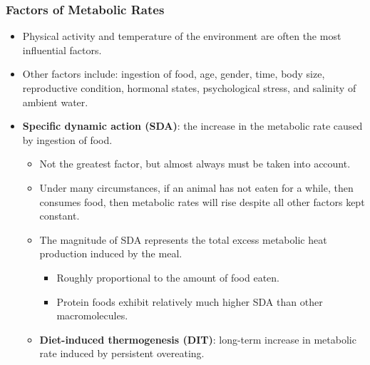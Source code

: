 \documentclass[12pt,a4paper]{article}
\begin{document}
\begin{itemize}
    \subsubsection{Factors of Metabolic Rates}
    \begin{itemize}
        \item {\color{o-Sun}Physical activity} and {\color{o-Sun}temperature of the environment} are often the most influential factors.
        \item Other factors include: ingestion of food, age, gender, time, body size, reproductive condition, hormonal states, psychological stress, and salinity of ambient water.
        \item \textbf{Specific dynamic action (SDA)}: the increase in the metabolic rate caused by ingestion of food.
            \begin{itemize}
                \item Not the greatest factor, but almost always must be taken into account.
                \item Under many circumstances, if an animal has not eaten for a while, then consumes food, then metabolic rates will rise despite all other factors kept constant.
                \item The {\color{o-Sun}magnitude} of SDA represents the total excess metabolic heat production induced by the meal.
                    \begin{itemize}
                        \item Roughly proportional to the amount of food eaten.
                        \item Protein foods exhibit relatively much higher SDA than other macromolecules.
                    \end{itemize}
                \item \textbf{Diet-induced thermogenesis (DIT)}: long-term increase in metabolic rate induced by persistent overeating.
            \end{itemize}
    \end{itemize}

\end{itemize}
\end{document}
